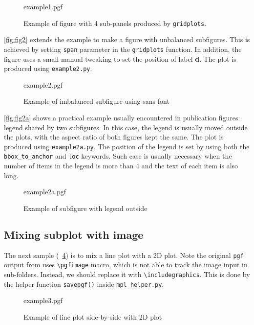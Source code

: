 \begin{figure}[htbp]
  \centering
  {example1.pgf}
  \caption{Example of figure with 4 sub-panels produced by
    \texttt{gridplots}.}
  \label{fig:fig1}
\end{figure}

\autoref{fig:fig2} extends the example to make a figure with
unbalanced subfigures. This is achieved by setting \texttt{span}
parameter in the \texttt{gridplots} function. In addition, the figure
uses a small manual tweaking to set the position of label
\textbf{\textsf{d}}. The plot is produced using \verb|example2.py|.


\begin{figure}[htbp]
  \centering
  {example2.pgf}
  \caption{Example of imbalanced subfigure using sans font}
  \label{fig:fig2}
\end{figure}

\autoref{fig:fig2a} shows a practical example usually encountered in
publication figures: legend shared by two subfigures. In this case,
the legend is usually moved outside the plots, with the aspect ratio
of both figures kept the same. The plot is produced using
\verb|example2a.py|. The position of the legend is set by using both
the \texttt{bbox\_to\_anchor} and \texttt{loc} keywords. Such case is
usually necessary when the number of items in the legend is more than
4 and the text of each item is also long.

\begin{figure}[htbp]
  \centering
  {example2a.pgf}
  \caption{Example of subfigure with legend outside}
  \label{fig:fig2a}
\end{figure}

\subsection{Mixing subplot with image}
\label{sec:mixing-subplot-with}

The next sample (~\ref{fig:fig3}) is to mix a line plot with a 2D
plot. Note the original \texttt{pgf} output from \mpl{} uses
\verb|\pgfimage| macro, which is not able to track the image input in
sub-folders. Instead, we should replace it with
\verb|\includegraphics|. This is done by the helper function
\verb|savepgf()| inside \verb|mpl_helper.py|.

\begin{figure}[htbp]
  \centering
  {example3.pgf}
  \caption{Example of line plot side-by-side with 2D plot}
  \label{fig:fig3}
\end{figure}


  

